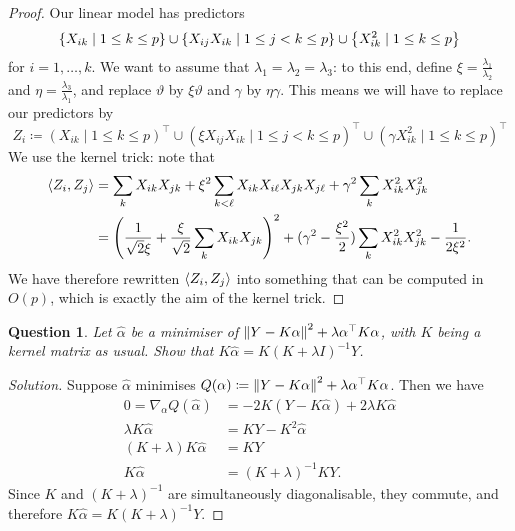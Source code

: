 \documentclass{article}
\theoremstyle{plain}
\newtheorem{question}{Question}
\theoremstyle{remark}
\newenvironment{solution}{\begin{proof}[Solution]\renewcommand\qedsymbol{}}{\end{proof}}
\renewcommand{\theta}{\vartheta}
\DeclarePairedDelimiter{\ang}{\langle}{\rangle}
\newcommand{\T}{^\top} %
\newcommand\ceq\coloneqq %
\begin{document}
\begin{proof}
	Our linear model has predictors
	\[
	\qty{X_{ik} \mid 1 \leq k \leq p} \cup \qty{X_{ij} X_{ik} \mid 1 \leq j < k \leq p} \cup \qty{X_{ik}^2 \mid 1 \leq k \leq p}
	\]
	for $i = 1, \dotsc, k$. We want to assume that $\lambda_1 = \lambda_2 = \lambda_3$: to this end, define $\xi = \frac{\lambda_1}{\lambda_2}$ and $\eta = \frac{\lambda_3}{\lambda_1}$, and replace $\theta$ by $\xi\theta$ and $\gamma$ by $\eta\gamma$. This means we will have to replace our predictors by
	\[
	Z_i \ceq 
	(X_{ik} \mid 1 \leq k \leq p)\T \cup (\xi X_{ij} X_{ik} \mid 1 \leq j < k \leq p)\T \cup (\gamma X_{ik}^2 \mid 1 \leq k \leq p)\T
	\]
	We use the kernel trick: note that
	\begin{align*}
	\ang{Z_i, Z_j} &= \sum_k X_{ik}X_{jk} + \xi^2 \sum_{k < \ell} X_{ik} X_{i\ell} X_{jk} X_{j\ell} + \gamma^2 \sum_k X_{ik}^2 X_{jk}^2 \\
	&= \qty(\frac{1}{\sqrt 2\xi} + \frac{\xi}{\sqrt 2}\sum_k X_{ik}X_{jk})^2 + (\gamma^2 - \frac{\xi^2}{2})\sum_k X_{ik}^2 X_{jk}^2 - \frac{1}{2\xi^2}.
	\end{align*}
	We have therefore rewritten $\ang{Z_i, Z_j}$ into something that can be computed in $O(p)$, which is exactly the aim of the kernel trick.
\end{proof}

\begin{question}
	Let $\hat\alpha$ be a minimiser of $\norm{Y - K\alpha}^2 + \lambda \alpha\T K\alpha$, with $K$ being a kernel matrix as usual. Show that $K\hat\alpha = K(K + \lambda I)^{-1} Y$. 
\end{question}

\begin{solution}
	Suppose $\hat\alpha$ minimises $Q(\alpha) \ceq \norm{Y - K\alpha}^2 + \lambda \alpha\T K\alpha$. Then we have
	\begin{align*}
		0 = \nabla_\alpha Q(\hat\alpha) &= -2 K (Y - K\hat\alpha) + 2\lambda K\hat\alpha \\
		\lambda K\hat\alpha &= KY - K^2\hat\alpha \\
		(K + \lambda) K\hat\alpha &= KY \\
		K\hat\alpha &= (K + \lambda)^{-1} KY.
	\end{align*}
Since $K$ and $(K + \lambda)^{-1}$ are simultaneously diagonalisable, they commute, and therefore $K\hat\alpha = K(K + \lambda)^{-1} Y$. 
\end{solution}
\end{document}
